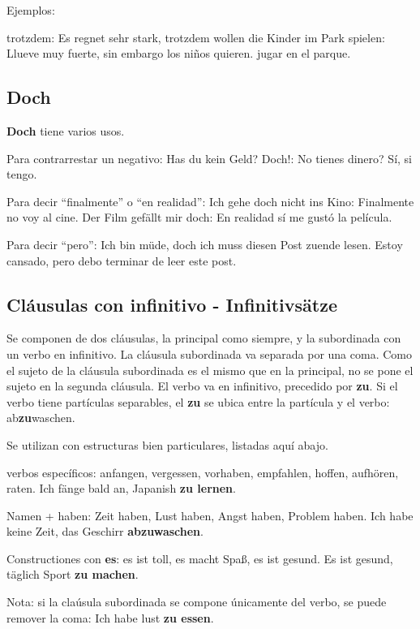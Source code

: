 Ejemplos:
\begin{myitemize}
\item trotzdem: Es regnet sehr stark, trotzdem wollen die Kinder im Park spielen: Llueve muy fuerte, sin embargo los niños quieren. jugar en el parque.
\end{myitemize}

\subsection{Doch}
\textbf{Doch} tiene varios usos.

Para contrarrestar un negativo:
Has du kein Geld? Doch!: No tienes dinero? Sí, si tengo.

Para decir ``finalmente'' o ``en realidad'':
Ich gehe doch nicht ins Kino: Finalmente no voy al cine.
Der Film gefällt mir doch: En realidad sí me gustó la película.

Para decir ``pero'':
Ich bin müde, doch ich muss diesen Post zuende lesen. Estoy cansado, pero debo terminar de leer este post.

\subsection{Cláusulas con infinitivo - Infinitivsätze}
Se componen de dos cláusulas, la principal como siempre, y la subordinada con un verbo en infinitivo. La cláusula subordinada va separada por una coma. Como el sujeto de la cláusula subordinada es el mismo que en la principal, no se pone el sujeto en la segunda cláusula. El verbo va en infinitivo, precedido por \textbf{zu}. Si el verbo tiene partículas separables, el \textbf{zu} se ubica entre la partícula y el verbo: ab\textbf{zu}waschen.


Se utilizan con estructuras bien particulares, listadas aquí abajo.

\begin{myitemize}
\item verbos específicos: anfangen, vergessen, vorhaben, empfahlen, hoffen, aufhören, raten. Ich fänge bald an, Japanish \textbf{zu lernen}.
\item Namen + haben: Zeit haben, Lust haben, Angst haben, Problem haben. Ich habe keine Zeit, das Geschirr \textbf{abzuwaschen}.
\item Constructiones con \textbf{es}: es ist toll, es macht Spaß, es ist gesund. Es ist gesund, täglich Sport \textbf{zu machen}.
\end{myitemize}

Nota: si la claúsula subordinada se compone únicamente del verbo, se puede remover la coma: Ich habe lust \textbf{zu essen}.